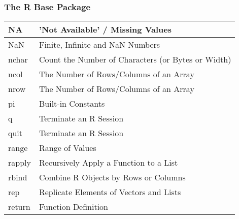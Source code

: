 \documentclass{beamer}
\begin{document}
\begin{frame}
    \frametitle{The R Base Package} 

{\scriptsize
\begin{center}
\begin{tabular}{|l|l|}
 \hline
NA  &		'Not Available' / Missing Values \\ \hline
NaN	 &	Finite, Infinite and NaN Numbers \\ \hline
nchar &		Count the Number of Characters (or Bytes or Width) \\ \hline
ncol	 &	The Number of Rows/Columns of an Array \\ \hline
nrow	 &	The Number of Rows/Columns of an Array \\ \hline
pi	 &	Built-in Constants \\ \hline
q  &	Terminate an R Session \\ \hline
quit	 & Terminate an R Session \\ \hline
range  &	Range of Values \\ \hline
rapply  &	Recursively Apply a Function to a List \\ \hline
rbind	 & Combine R Objects by Rows or Columns \\ \hline
rep  &	Replicate Elements of Vectors and Lists \\ \hline
return  &	Function Definition \\ \hline
\end{tabular}
\end{center}
}

\end{frame}
\end{document}
